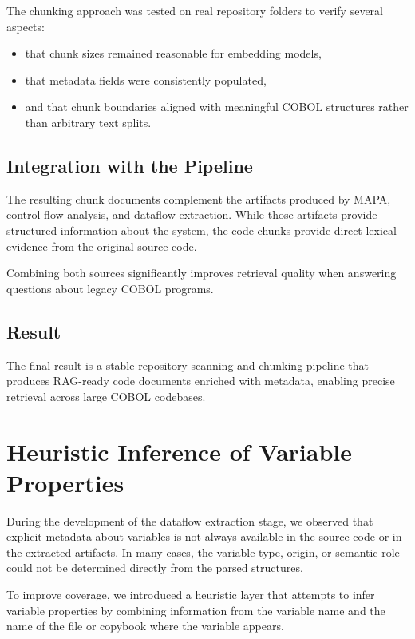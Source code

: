 \documentclass[11pt]{article}
\begin{document}
The chunking approach was tested on real repository folders to verify several aspects:

\begin{itemize}
\item that chunk sizes remained reasonable for embedding models,
\item that metadata fields were consistently populated,
\item and that chunk boundaries aligned with meaningful COBOL structures rather than arbitrary text splits.
\end{itemize}

\subsection*{Integration with the Pipeline}

The resulting chunk documents complement the artifacts produced by MAPA, control-flow analysis, and dataflow extraction. While those artifacts provide structured information about the system, the code chunks provide direct lexical evidence from the original source code.

Combining both sources significantly improves retrieval quality when answering questions about legacy COBOL programs.

\subsection*{Result}

The final result is a stable repository scanning and chunking pipeline that produces RAG-ready code documents enriched with metadata, enabling precise retrieval across large COBOL codebases.


\section{Heuristic Inference of Variable Properties}
\label{sec:heuristics}

During the development of the dataflow extraction stage, we observed that explicit metadata about variables is not always available in the source code or in the extracted artifacts. In many cases, the variable type, origin, or semantic role could not be determined directly from the parsed structures.

To improve coverage, we introduced a heuristic layer that attempts to infer variable properties by combining information from the variable name and the name of the file or copybook where the variable appears.
\end{document}
